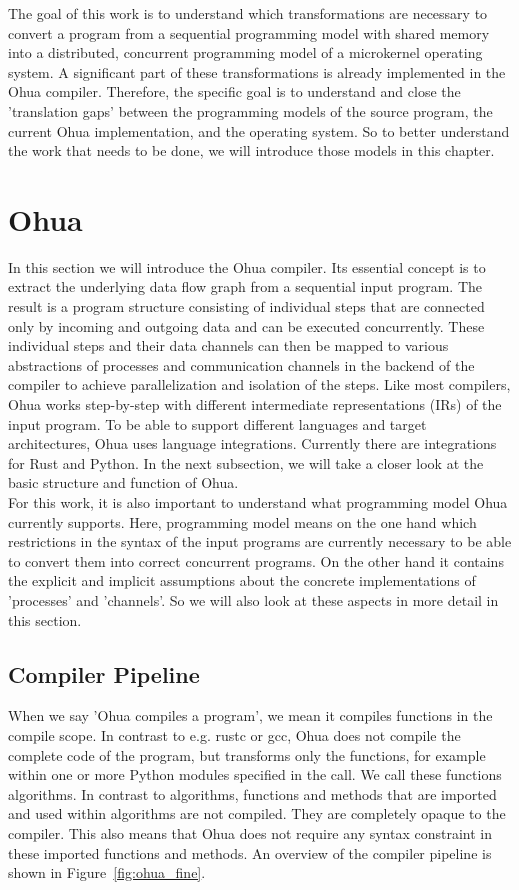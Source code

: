 The goal of this work is to understand which transformations are necessary to convert a program from a sequential programming model with shared memory into a distributed, concurrent programming model of a microkernel operating system. A significant part of these transformations is already implemented in the Ohua compiler. Therefore, the specific goal is to understand and close the 'translation gaps' between the programming models of the source program, the current Ohua implementation, and the \md operating system. So to better understand the work that needs to be done, we will introduce those models in this chapter.

\section{Ohua}
\label{sec:back_ohua}
In this section we will introduce the Ohua compiler\cite{ertel2015ohua}. Its essential concept is to extract the underlying data flow graph from a sequential input program. The result is a program structure consisting of individual steps that are connected only by incoming and outgoing data and can be executed concurrently. These individual steps and their data channels can then be mapped to various abstractions of processes and communication channels in the backend of the compiler to achieve parallelization and isolation of the steps. Like most compilers, Ohua works step-by-step with different intermediate representations (IRs) of the input program. To be able to support different languages and target architectures, Ohua uses language integrations. Currently there are integrations for Rust and Python. In the next subsection, we will take a closer look at the basic structure and function of Ohua. \\

For this work, it is also important to understand what programming model Ohua currently supports. Here, programming model means on the one hand which restrictions in the syntax of the input programs are currently necessary to be able to convert them into correct concurrent programs. On the other hand it contains the explicit and implicit assumptions about the concrete implementations of 'processes' and 'channels'. So we will also look at these aspects in more detail in this section.

\subsection{Compiler Pipeline}
\label{subec:OhuaPipeline}
When we say 'Ohua compiles a program', we mean it compiles functions in the compile scope. In contrast to e.g. rustc or gcc, Ohua does not compile the complete code of the program, but transforms only the functions, for example within one or more Python modules specified in the call. We call these functions algorithms. In contrast to algorithms, functions and methods that are imported and used within algorithms are not compiled. They are completely opaque to the compiler. This also means that Ohua does not require any syntax constraint in these imported functions and methods. An overview of the compiler pipeline is shown in Figure~\ref{fig:ohua_fine}.\\


